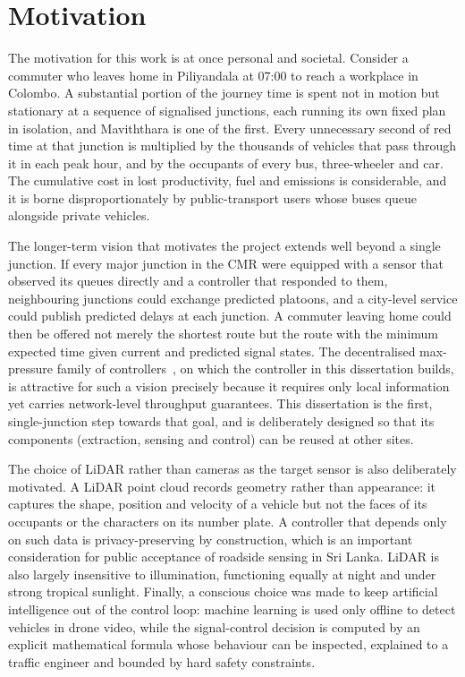 \section{Motivation}\label{sec:intro-motivation}

The motivation for this work is at once personal and societal. Consider a commuter who leaves home in Piliyandala at 07:00 to reach a workplace in Colombo. A substantial portion of the journey time is spent not in motion but stationary at a sequence of signalised junctions, each running its own fixed plan in isolation, and Maviththara is one of the first. Every unnecessary second of red time at that junction is multiplied by the thousands of vehicles that pass through it in each peak hour, and by the occupants of every bus, three-wheeler and car. The cumulative cost in lost productivity, fuel and emissions is considerable, and it is borne disproportionately by public-transport users whose buses queue alongside private vehicles.

The longer-term vision that motivates the project extends well beyond a single junction. If every major junction in the CMR were equipped with a sensor that observed its queues directly and a controller that responded to them, neighbouring junctions could exchange predicted platoons, and a city-level service could publish predicted delays at each junction. A commuter leaving home could then be offered not merely the shortest route but the route with the minimum expected time given current and predicted signal states. The decentralised max-pressure family of controllers~\cite{varaiya2013maxpressure,tassiulas1992}, on which the controller in this dissertation builds, is attractive for such a vision precisely because it requires only local information yet carries network-level throughput guarantees. This dissertation is the first, single-junction step towards that goal, and is deliberately designed so that its components (extraction, sensing and control) can be reused at other sites.

The choice of LiDAR rather than cameras as the target sensor is also deliberately motivated. A LiDAR point cloud records geometry rather than appearance: it captures the shape, position and velocity of a vehicle but not the faces of its occupants or the characters on its number plate. A controller that depends only on such data is privacy-preserving by construction, which is an important consideration for public acceptance of roadside sensing in Sri Lanka. LiDAR is also largely insensitive to illumination, functioning equally at night and under strong tropical sunlight. Finally, a conscious choice was made to keep artificial intelligence out of the control loop: machine learning is used only offline to detect vehicles in drone video, while the signal-control decision is computed by an explicit mathematical formula whose behaviour can be inspected, explained to a traffic engineer and bounded by hard safety constraints.


